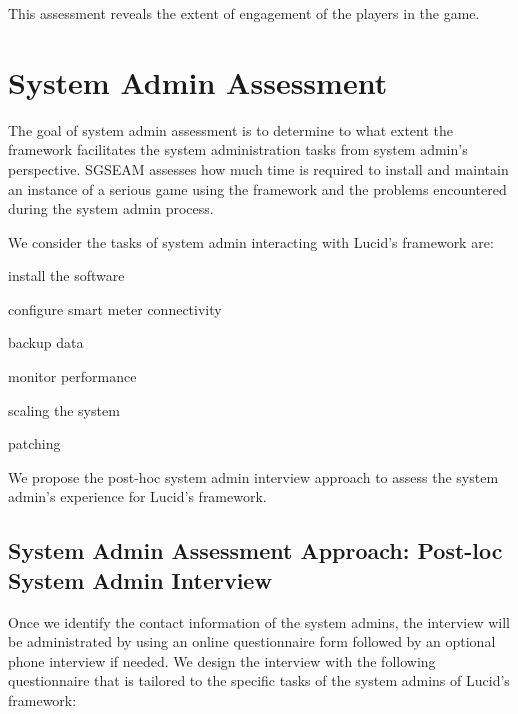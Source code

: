 \documentclass[11pt,oneside]{book}
\begin{document}
This assessment reveals the extent of engagement of the players in the game.

\section{System Admin Assessment}

The goal of system admin assessment is to determine to what extent the 
framework facilitates the system administration tasks from system admin's perspective. SGSEAM 
assesses how much time is required to install and maintain an instance of a serious game using the 
framework and the problems encountered  during the system admin process.

We consider the tasks of system admin interacting with Lucid's framework are:
\begin{compactenum}
    \item install the software
    \item configure smart meter connectivity
    \item backup data
    \item monitor performance
    \item scaling the system
    \item patching
\end{compactenum}

We propose the post-hoc system admin interview approach to assess the system admin's experience for Lucid's framework.

\subsection{System Admin Assessment Approach: Post-loc System Admin Interview}
\label{Post-hoc system admin interview}

Once we identify the contact information of the system admins, the interview will be administrated by using an online questionnaire form followed by an optional phone interview if needed. We design the interview with the following questionnaire that is tailored to the specific tasks of the system admins of Lucid's framework:
\end{document}
